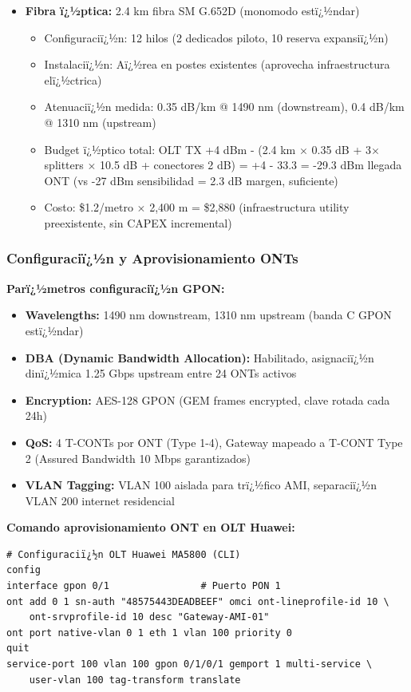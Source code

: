 \begin{itemize}
    \item \textbf{Fibra ï¿½ptica:} 2.4 km fibra SM G.652D (monomodo estï¿½ndar)
    \begin{itemize}
        \item Configuraciï¿½n: 12 hilos (2 dedicados piloto, 10 reserva expansiï¿½n)
        \item Instalaciï¿½n: Aï¿½rea en postes existentes (aprovecha infraestructura elï¿½ctrica)
        \item Atenuaciï¿½n medida: 0.35 dB/km @ 1490 nm (downstream), 0.4 dB/km @ 1310 nm (upstream)
        \item Budget ï¿½ptico total: OLT TX +4 dBm - (2.4 km $\times$ 0.35 dB + 3$\times$ splitters $\times$ 10.5 dB + conectores 2 dB) = +4 - 33.3 = -29.3 dBm llegada ONT (vs -27 dBm sensibilidad = 2.3 dB margen, suficiente)
        \item Costo: \$1.2/metro $\times$ 2,400 m = \$2,880 (infraestructura utility preexistente, sin CAPEX incremental)
    \end{itemize}
\end{itemize}

\subsubsection{Configuraciï¿½n y Aprovisionamiento ONTs}

\textbf{Parï¿½metros configuraciï¿½n GPON:}

\begin{itemize}
    \item \textbf{Wavelengths:} 1490 nm downstream, 1310 nm upstream (banda C GPON estï¿½ndar)
    \item \textbf{DBA (Dynamic Bandwidth Allocation):} Habilitado, asignaciï¿½n dinï¿½mica 1.25 Gbps upstream entre 24 ONTs activos
    \item \textbf{Encryption:} AES-128 GPON (GEM frames encrypted, clave rotada cada 24h)
    \item \textbf{QoS:} 4 T-CONTs por ONT (Type 1-4), Gateway mapeado a T-CONT Type 2 (Assured Bandwidth 10 Mbps garantizados)
    \item \textbf{VLAN Tagging:} VLAN 100 aislada para trï¿½fico AMI, separaciï¿½n VLAN 200 internet residencial
\end{itemize}

\textbf{Comando aprovisionamiento ONT en OLT Huawei:}

\begin{verbatim}
# Configuraciï¿½n OLT Huawei MA5800 (CLI)
config
interface gpon 0/1                # Puerto PON 1
ont add 0 1 sn-auth "48575443DEADBEEF" omci ont-lineprofile-id 10 \
    ont-srvprofile-id 10 desc "Gateway-AMI-01"
ont port native-vlan 0 1 eth 1 vlan 100 priority 0
quit
service-port 100 vlan 100 gpon 0/1/0/1 gemport 1 multi-service \
    user-vlan 100 tag-transform translate
\end{verbatim}

